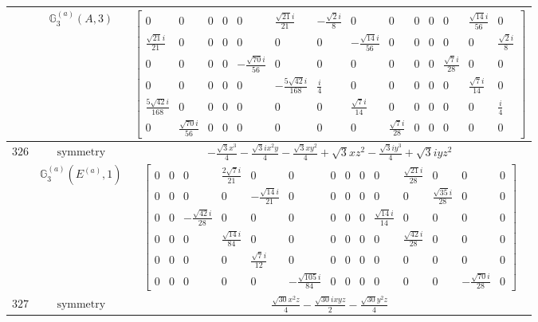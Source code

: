 \documentclass[fleqn,8pt,landscape]{jsarticle}
\begin{document}
\begin{longtable}{ccc}
$  $ & $ \mathbb{G}_{3}^{(a)}(A,3) $ & $ \begin{bmatrix} 0 & 0 & 0 & 0 & 0 & \frac{\sqrt{21} i}{21} & - \frac{\sqrt{2} i}{8} & 0 & 0 & 0 & 0 & 0 & \frac{\sqrt{14} i}{56} & 0 \\ \frac{\sqrt{21} i}{21} & 0 & 0 & 0 & 0 & 0 & 0 & - \frac{\sqrt{14} i}{56} & 0 & 0 & 0 & 0 & 0 & \frac{\sqrt{2} i}{8} \\ 0 & 0 & 0 & 0 & - \frac{\sqrt{70} i}{56} & 0 & 0 & 0 & 0 & 0 & 0 & \frac{\sqrt{7} i}{28} & 0 & 0 \\ 0 & 0 & 0 & 0 & 0 & - \frac{5 \sqrt{42} i}{168} & \frac{i}{4} & 0 & 0 & 0 & 0 & 0 & \frac{\sqrt{7} i}{14} & 0 \\ \frac{5 \sqrt{42} i}{168} & 0 & 0 & 0 & 0 & 0 & 0 & \frac{\sqrt{7} i}{14} & 0 & 0 & 0 & 0 & 0 & \frac{i}{4} \\ 0 & \frac{\sqrt{70} i}{56} & 0 & 0 & 0 & 0 & 0 & 0 & \frac{\sqrt{7} i}{28} & 0 & 0 & 0 & 0 & 0 \end{bmatrix} $ \\ \hline
$ 326 $ & $ \text{symmetry} $ & $ - \frac{\sqrt{3} x^{3}}{4} - \frac{\sqrt{3} i x^{2} y}{4} - \frac{\sqrt{3} x y^{2}}{4} + \sqrt{3} x z^{2} - \frac{\sqrt{3} i y^{3}}{4} + \sqrt{3} i y z^{2} $ \\
$  $ & $ \mathbb{G}_{3}^{(a)}(E^{(a)},1) $ & $ \begin{bmatrix} 0 & 0 & 0 & \frac{2 \sqrt{7} i}{21} & 0 & 0 & 0 & 0 & 0 & 0 & \frac{\sqrt{21} i}{28} & 0 & 0 & 0 \\ 0 & 0 & 0 & 0 & - \frac{\sqrt{14} i}{21} & 0 & 0 & 0 & 0 & 0 & 0 & \frac{\sqrt{35} i}{28} & 0 & 0 \\ 0 & 0 & - \frac{\sqrt{42} i}{28} & 0 & 0 & 0 & 0 & 0 & 0 & \frac{\sqrt{14} i}{14} & 0 & 0 & 0 & 0 \\ 0 & 0 & 0 & \frac{\sqrt{14} i}{84} & 0 & 0 & 0 & 0 & 0 & 0 & \frac{\sqrt{42} i}{28} & 0 & 0 & 0 \\ 0 & 0 & 0 & 0 & \frac{\sqrt{7} i}{12} & 0 & 0 & 0 & 0 & 0 & 0 & 0 & 0 & 0 \\ 0 & 0 & 0 & 0 & 0 & - \frac{\sqrt{105} i}{84} & 0 & 0 & 0 & 0 & 0 & 0 & - \frac{\sqrt{70} i}{28} & 0 \end{bmatrix} $ \\ \hline
$ 327 $ & $ \text{symmetry} $ & $ \frac{\sqrt{30} x^{2} z}{4} - \frac{\sqrt{30} i x y z}{2} - \frac{\sqrt{30} y^{2} z}{4} $ \\

\end{longtable}
\end{document}
